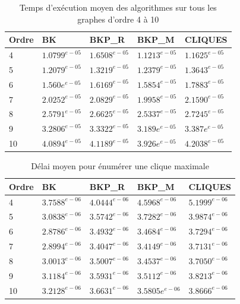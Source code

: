 \documentclass[12pt,a4paper]{article}
\begin{document}
\begin{table}[ht]
  \centering
  \begin{tabular}{|l||l|l|l|l|}
    \hline
    Ordre & BK & BKP\_R & BKP\_M & CLIQUES \\
    \hline
    \hline
    4  & $1.0799^{e-05}$ & $1.6508^{e-05}$ & $1.1213^{e-05}$ & $1.1625^{e-05}$ \\
    5  & $1.2079^{e-05}$ & $1.3219^{e-05}$ & $1.2379^{e-05}$ & $1.3643^{e-05}$ \\
    6  & $1.560e^{e-05}$  & $1.6169^{e-05}$ & $1.5854^{e-05}$  & $1.7883^{e-05}$ \\
    7  & $2.0252^{e-05}$ & $2.0829^{e-05}$ & $1.9958^{e-05}$ & $2.1590^{e-05}$   \\
    8  & $2.5791^{e-05}$ & $2.6625^{e-05}$ & $2.5337^{e-05}$   & $2.7245^{e-05}$ \\
    9  & $3.2806^{e-05}$ & $3.3322^{e-05}$  & $3.189e^{e-05}$  & $3.387e^{e-05}$  \\
    10 & $4.0894^{e-05}$ & $4.1189^{e-05}$ & $3.926e^{e-05}$ & $4.2038^{e-05}$  \\
    \hline
  \end{tabular}
  \caption{Temps d'exécution moyen des algorithmes sur tous les graphes d'ordre 4 à 10}
  \label{table:1}
\end{table}
\begin{table}[ht]
  \centering
  \begin{tabular}{|l||l|l|l|l|}
    \hline
    Ordre & BK & BKP\_R & BKP\_M & CLIQUES \\
    \hline
    \hline
    4  & $3.7588^{e-06}$ & $4.0444^{e-06}$ & $4.5968^{e-06}$ & $5.1999^{e-06}$ \\
    5  & $3.0838^{e-06}$ & $3.5742^{e-06}$ & $3.7282^{e-06}$ & $3.9874^{e-06}$ \\
    6  & $2.8786^{e-06}$ & $3.4932^{e-06}$ & $3.4684^{e-06}$ & $3.7294^{e-06}$ \\
    7  & $2.8994^{e-06}$ & $3.4047^{e-06}$ & $3.4149^{e-06}$ & $3.7131^{e-06}$   \\
    8  & $3.0013^{e-06}$ & $3.5007^{e-06}$ & $3.4537^{e-06}$ & $3.7050^{e-06}$ \\
    9  & $3.1184^{e-06}$ & $3.5931^{e-06}$ & $3.5112^{e-06}$ & $3.8213^{e-06}$  \\
    10 & $3.2128^{e-06}$ & $3.6631^{e-06}$ & $3.5805e^{e-06}$ & $3.8666^{e-06}$  \\
    \hline
    \end{tabular}
    \caption{Délai moyen pour énumérer une clique maximale}
    \label{table:2}
\end{table}
\end{document}
